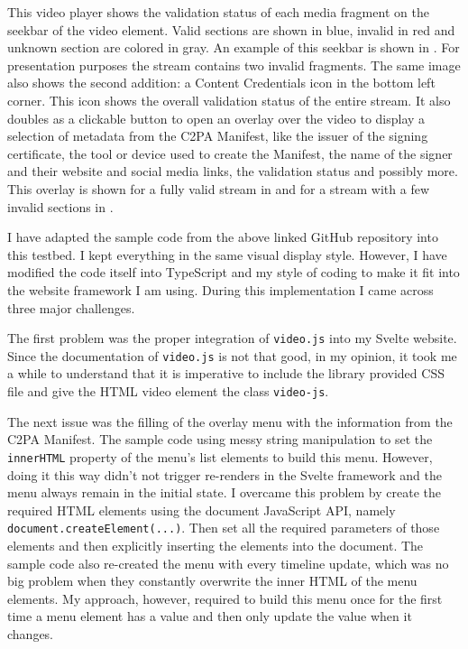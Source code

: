 This video player shows the validation status of each media fragment on the seekbar of the video element. Valid sections are shown in blue, invalid in red and unknown section are colored in gray. An example of this seekbar is shown in . For presentation purposes the stream contains two invalid fragments. The same image also shows the second addition: a Content Credentials icon in the bottom left corner. This icon shows the overall validation status of the entire stream. It also doubles as a clickable button to open an overlay over the video to display a selection of metadata from the C2PA Manifest, like the issuer of the signing certificate, the tool or device used to create the Manifest, the name of the signer and their website and social media links, the validation status and possibly more. This overlay is shown for a fully valid stream in  and for a stream with a few invalid sections in .

I have adapted the sample code from the above linked GitHub repository into this testbed. I kept everything in the same visual display style. However, I have modified the code itself into TypeScript and my style of coding to make it fit into the website framework I am using. During this implementation I came across three major challenges.

The first problem was the proper integration of \texttt{video.js} into my Svelte website. Since the documentation of \texttt{video.js} is not that good, in my opinion, it took me a while to understand that it is imperative to include the library provided CSS file and give the HTML video element the class \texttt{video-js}.

The next issue was the filling of the overlay menu with the information from the C2PA Manifest. The sample code using messy string manipulation to set the \texttt{innerHTML} property of the menu's list elements to build this menu. However, doing it this way didn't not trigger re-renders in the Svelte framework and the menu always remain in the initial state. I overcame this problem by create the required HTML elements using the document JavaScript API, namely \texttt{document.createElement(...)}. Then set all the required parameters of those elements and then explicitly inserting the elements into the document. The sample code also re-created the menu with every timeline update, which was no big problem when they constantly overwrite the inner HTML of the menu elements. My approach, however, required to build this menu once for the first time a menu element has a value and then only update the value when it changes.

